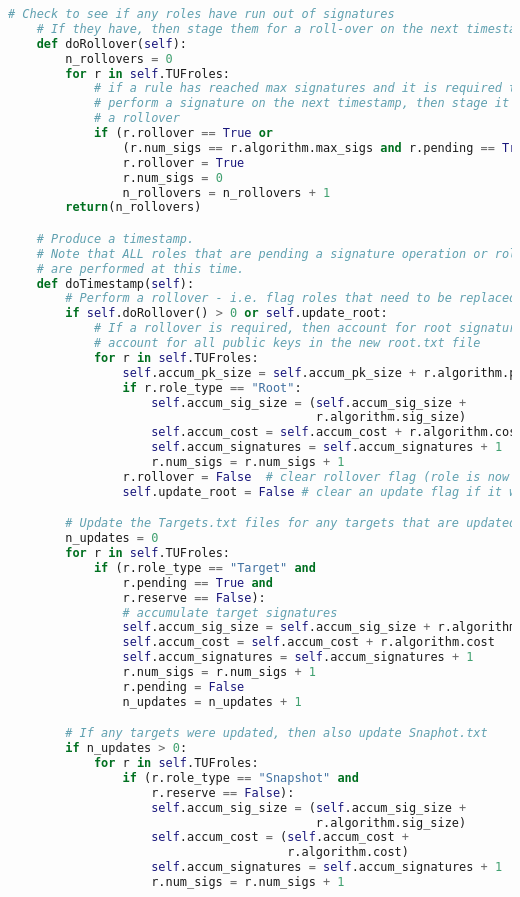 \documentclass{article}
\begin{document}
\begin{lstlisting}[language=Python, basicstyle=\tiny]
    # Check to see if any roles have run out of signatures
    # If they have, then stage them for a roll-over on the next timestamp
    def doRollover(self):
        n_rollovers = 0
        for r in self.TUFroles:
            # if a rule has reached max signatures and it is required to
            # perform a signature on the next timestamp, then stage it for
            # a rollover
            if (r.rollover == True or
                (r.num_sigs == r.algorithm.max_sigs and r.pending == True)):
                r.rollover = True
                r.num_sigs = 0
                n_rollovers = n_rollovers + 1
        return(n_rollovers)

    # Produce a timestamp.
    # Note that ALL roles that are pending a signature operation or rollover
    # are performed at this time.  
    def doTimestamp(self):
        # Perform a rollover - i.e. flag roles that need to be replaced
        if self.doRollover() > 0 or self.update_root:
            # If a rollover is required, then account for root signatures +
            # account for all public keys in the new root.txt file
            for r in self.TUFroles:
                self.accum_pk_size = self.accum_pk_size + r.algorithm.pk_size
                if r.role_type == "Root":
                    self.accum_sig_size = (self.accum_sig_size +
                                           r.algorithm.sig_size)
                    self.accum_cost = self.accum_cost + r.algorithm.cost
                    self.accum_signatures = self.accum_signatures + 1
                    r.num_sigs = r.num_sigs + 1
                r.rollover = False  # clear rollover flag (role is now updated)
                self.update_root = False # clear an update flag if it was set

        # Update the Targets.txt files for any targets that are updated
        n_updates = 0
        for r in self.TUFroles:
            if (r.role_type == "Target" and
                r.pending == True and
                r.reserve == False):
                # accumulate target signatures 
                self.accum_sig_size = self.accum_sig_size + r.algorithm.sig_size
                self.accum_cost = self.accum_cost + r.algorithm.cost
                self.accum_signatures = self.accum_signatures + 1
                r.num_sigs = r.num_sigs + 1
                r.pending = False
                n_updates = n_updates + 1

        # If any targets were updated, then also update Snaphot.txt
        if n_updates > 0:
            for r in self.TUFroles:
                if (r.role_type == "Snapshot" and
                    r.reserve == False):
                    self.accum_sig_size = (self.accum_sig_size +
                                           r.algorithm.sig_size)
                    self.accum_cost = (self.accum_cost +
                                       r.algorithm.cost)
                    self.accum_signatures = self.accum_signatures + 1
                    r.num_sigs = r.num_sigs + 1
                

\end{lstlisting}
\end{document}
